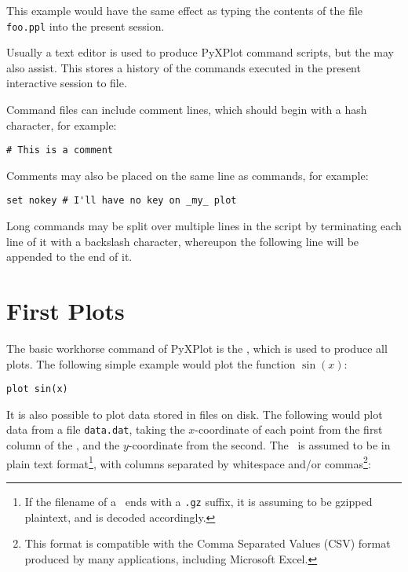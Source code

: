 \noindent This example would have the same effect as typing the contents of the
file {\tt foo.ppl} into the present session.

Usually a text editor is used to produce PyXPlot command scripts, but the
 may also assist. This stores a history of the commands executed
in the present interactive session to file.

Command files can include comment lines, which should begin with a hash
character, for example:

\begin{verbatim}
# This is a comment
\end{verbatim}

\noindent Comments may also be placed on the same line as commands, for
example:

\begin{verbatim}
set nokey # I'll have no key on _my_ plot
\end{verbatim}

Long commands may be split over multiple lines in the script by terminating
each line of it with a backslash character, whereupon the following line will
be appended to the end of it.

\section{First Plots}
\label{first_plots}

The basic workhorse command of PyXPlot is the , which is used to
produce all plots. The following simple example would plot the function
$\sin(x)$:

\begin{verbatim}
plot sin(x)
\end{verbatim}

\noindent It is also possible to plot data stored in files on disk. The
following would plot data from a file {\tt data.dat}, taking the
$x$-coordinate of each point from the first column of the \datafile, and the
$y$-coordinate from the second.  The \datafile\ is assumed to be in plain text
format\footnote{If the filename of a \datafile\ ends with a {\tt .gz} suffix,
it is assuming to be gzipped plaintext, and is decoded accordingly.}, with
columns separated by whitespace and/or commas\footnote{This format is
compatible with the Comma Separated Values (CSV) format produced by many
applications, including Microsoft Excel.}:

